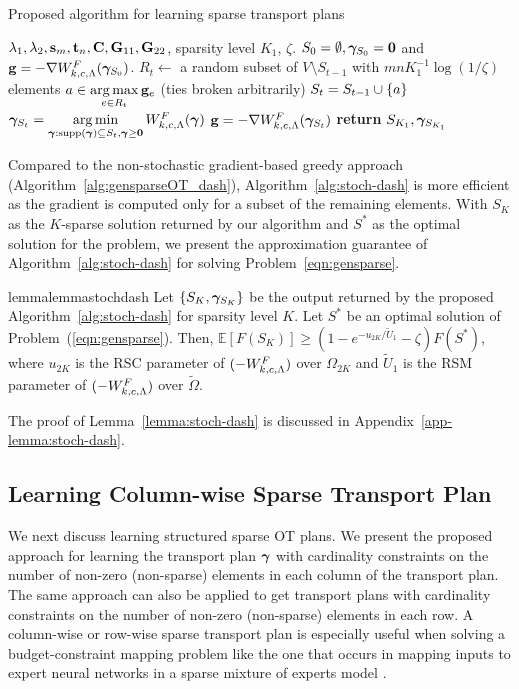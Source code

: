 \begin{algorithm}[t]
\caption[Proposed algorithm for learning sparse transport plans]{Proposed algorithm for learning sparse transport plans}
\begin{algorithmic}[1]
\Require  $\lambda_1, \lambda_2, \mathbf{s}_m, \mathbf{t}_n, \mathbf{C}, \mathbf{G}_{11}, \mathbf{G}_{22}$, sparsity level $K_1$, $\zeta$.
\State $S_0=\emptyset, \bm{\gamma}_{S_0} = \mathbf{0}$ and $\mathbf{g} = -\nabla W^F_{k, c, \Lambda}(\bm{\gamma}_{S_0})$.
\State $R_t\leftarrow$ a random subset of $V\setminus S_{t-1}$ with  $mnK_1^{-1}\log(1/\zeta)$ elements 
\State $a \in \mathop{\rm arg\,max}\limits_{e\in R_t}{\mathbf{g}_e}$ (ties broken arbitrarily)
\State $S_t = S_{t-1}\cup \{a\}$
\State $\bm{\gamma}_{S_t} = \mathop{\rm arg\,min}\limits_{\bm{\gamma}:\textup{supp}(\bm{\gamma})\subseteq S_t, \bm{\gamma}\ge \mathbf{0}}{W^F_{k, c, \Lambda}(\bm{\gamma})}$ %
\State $\mathbf{g}= -\nabla W^F_{k, c, \Lambda}(\bm{\gamma}_{S_t})$
\EndFor
\State \textbf{return} $S_{K_1}, \bm{\gamma}_{S_{K_1}}$
\end{algorithmic}\label{alg:stoch-dash}
\end{algorithm}
 
Compared to the non-stochastic gradient-based greedy approach (Algorithm~\ref{alg:gensparseOT_dash}), Algorithm~\ref{alg:stoch-dash} is more efficient as the gradient is computed only for a subset of the remaining elements.
With $S_K$ as the $K$-sparse solution returned by our algorithm and $S^*$ as the optimal solution for the problem, we present the approximation guarantee of Algorithm~\ref{alg:stoch-dash} for solving Problem~\ref{eqn:gensparse}. 
\begin{lemmaBox}
\begin{restatable}{lemma}{lemmastochdash}\label{lemma:stoch-dash}
Let $\{S_K,\bm{\gamma}_{S_K}\}$ be the output returned by the proposed Algorithm~\ref{alg:stoch-dash} for sparsity level $K$. Let $S^{*}$ be an optimal solution of Problem~(\ref{eqn:gensparse}). 
Then, $\mathbb{E}[F(S_K)] \geq (1- e^{-u_{2K}/\tilde{U}_1}-\zeta) F(S^{*})$, where $u_{2K}$ is the RSC parameter of $(-W^F_{k, c, \Lambda})$ over $\Omega_{2K}$ and $\tilde{U}_1$ is the RSM parameter of $(-W^F_{k, c, \Lambda})$ over $\tilde{\Omega}$.
\end{restatable}
\end{lemmaBox}
The proof of Lemma~\ref{lemma:stoch-dash} is discussed in Appendix~\ref{app-lemma:stoch-dash}.

\subsection{Learning Column-wise Sparse Transport Plan}\label{subsec:partitionmatroid}
We next discuss learning structured sparse OT plans. We present the proposed approach for learning the transport plan $\bm{\gamma}$ with cardinality constraints on the number of non-zero (non-sparse) elements in each column of the transport plan. The same approach can also be applied to get transport plans with cardinality constraints on the number of non-zero (non-sparse) elements in each row. A column-wise or row-wise sparse transport plan is especially useful when solving a budget-constraint mapping problem like the one that occurs in mapping inputs to expert neural networks in a sparse mixture of experts model \citep{liu2023sparsityconstrained}. 

